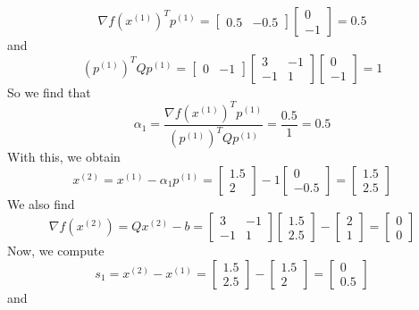 \documentclass[12pt]{article}
\begin{document}
\[
\nabla f(x^{(1)})^T p^{(1)} =
\begin{bmatrix}
0.5 & -0.5
\end{bmatrix}
\begin{bmatrix}
0\\
-1
\end{bmatrix} = 0.5
\] and
\[
(p^{(1)} )^T Q p^{(1)}  = 
\begin{bmatrix}
0& -1
\end{bmatrix}
\begin{bmatrix}
3 & -1\\
-1 & 1
\end{bmatrix}
\begin{bmatrix}
0\\
-1
\end{bmatrix} = 1
\] So we find that
\[
\alpha_1 = \frac{\nabla f(x^{(1)})^T p^{(1)}  }{(p^{(1)} )^T Q p^{(1)} } = \frac{0.5}{1} = 0.5
\] With this, we obtain
\[
x^{(2)} = x^{(1)} - \alpha_1 p^{(1)} = 
\begin{bmatrix}
1.5\\
2
\end{bmatrix} - 1\begin{bmatrix}
0\\
-0.5
\end{bmatrix} =
\begin{bmatrix}
1.5\\
2.5
\end{bmatrix} 
\] We also find
\[
\nabla f(x^{(2)}) = Q x^{(2)} - b = \begin{bmatrix}
3 & -1\\
-1 & 1
\end{bmatrix}
\begin{bmatrix}
1.5\\
2.5
\end{bmatrix} - 
\begin{bmatrix}
2\\
1
\end{bmatrix} =
\begin{bmatrix}
0\\
0
\end{bmatrix}
\] Now, we compute
\[
s_1 = x^{(2)} - x^{(1)} = \begin{bmatrix}
1.5\\
2.5
\end{bmatrix} - \begin{bmatrix}
1.5\\
2
\end{bmatrix} =
\begin{bmatrix}
0\\
0.5
\end{bmatrix} 
\] and
\end{document}

